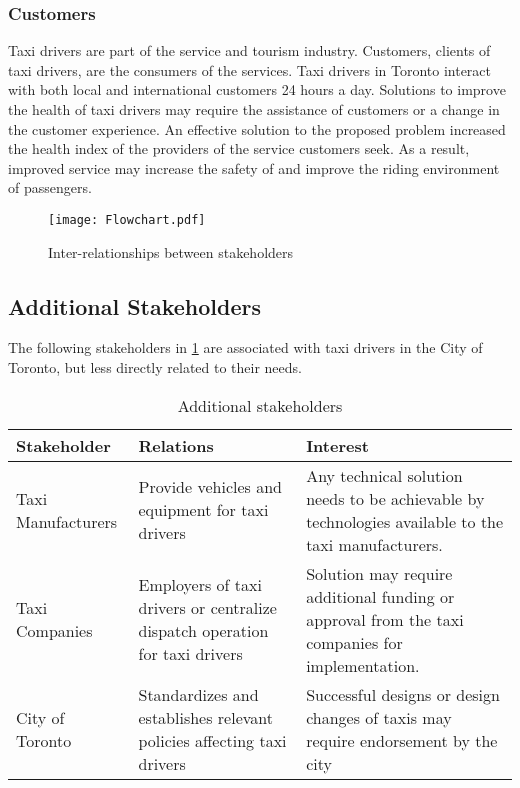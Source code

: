 \documentclass[11pt]{article}
\begin{document}
\subsubsection{Customers}
Taxi drivers are part of the service and tourism industry. Customers,
clients of taxi drivers, are the consumers of the services. Taxi 
drivers in Toronto interact with both local and international customers 
24 hours a day. Solutions to improve the health of taxi drivers 
may require the assistance of customers or a change in the customer 
experience. An effective solution to the proposed problem increased 
the health index of the providers of the service customers seek. As a 
result, improved service may increase the safety of and improve the 
riding environment of passengers.

 
\begin{figure}
  \centering
  \texttt{[image: Flowchart.pdf]}
  \caption{Inter-relationships between stakeholders}
\end{figure}
\subsection{Additional Stakeholders}

The following stakeholders in \ref{tab:stakeholders} are associated with taxi drivers in the City 
of Toronto, but less directly related to their needs. 

\begin{table}[h]
  \centering
  \caption{Additional stakeholders}
  \label{tab:stakeholders}
    \begin{tabular}{ l p{5cm} p{5cm}}
    Stakeholder & Relations &	Interest \\ \hline
    Taxi Manufacturers & Provide vehicles and equipment for taxi drivers	& 
    Any technical solution needs to be achievable by technologies available 
    to the taxi manufacturers. \\ 
    Taxi Companies & Employers of taxi drivers or centralize dispatch 
    operation for taxi drivers	& Solution may require additional funding 
    or approval from the taxi companies for implementation. \\
    City of Toronto & Standardizes and establishes relevant policies 
    affecting taxi drivers \cite{CityofToronto}	& Successful designs or design changes of  
    taxis may require endorsement by the city  \\
    \end{tabular}
\end{table}
\clearpage
\end{document}

